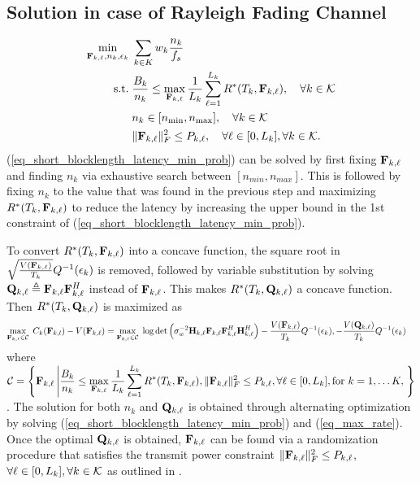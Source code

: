 \documentclass[a4paper, 12pt, onecolumn, journal, twoside, draftclsnofoot]{IEEEtran}
\begin{document}
\subsection{Solution in case of Rayleigh Fading Channel}
\begin{equation}
	\begin{split}
		\min_{{\bf F}_{k,\ell}, n_k, \epsilon_k} \;& \sum_{k \in K} w_k \frac{n_k}{f_s} \\
		\text{s.t.}\;& \frac{B_k}{n_k} \leq \max_{{\bf F}_{k, \ell}} \frac{1}{L_k} \sum_{\ell=1}^{L_k} 		R^*(T_{k}, {\bf F}_{k, \ell}), \quad \forall k \in { \mathcal{K} } \\ 
		& n_k \in [n_{\text{min}}, n_{\text{max}}], \quad \forall k \in { \mathcal{K} } \\
		& \|{\bf F}_{k,\ell}\|_F^2 \leq P_{k,\ell}, \quad \forall \ell \in [0, L_k],  \forall k \in { \mathcal{K} }.
	\end{split}
\label{eq_short_blocklength_latency_min_prob}
\end{equation}
(\ref{eq_short_blocklength_latency_min_prob}) can be solved by first fixing ${\bf F}_{k,\ell}$ and finding $n_k$ via exhaustive search between $[n_{min}, n_{max}]$.  This is followed by fixing $n_k$ to the value that was found in the previous step and maximizing $R^*(T_k, {\bf F}_{k,\ell})$ to reduce the latency by increasing the upper bound in the 1st constraint of (\ref{eq_short_blocklength_latency_min_prob}). 

To convert  $R^*(T_k, {\bf F}_{k,\ell})$ into a concave function, the square root in $\sqrt{\frac{V({\bf F}_{k,\ell})}{T_k}} Q^{-1}{(\epsilon_k)}$ is removed, followed by variable substitution by solving ${\bf Q}_{k,\ell} \triangleq {\bf F}_{k,\ell}{\bf F}_{k,\ell}^H$ instead of ${\bf F}_{k,\ell}$.  This makes $R^*(T_k, {\bf Q}_{k,\ell})$ a concave function. Then $R^*(T_k, {\bf Q}_{k,\ell})$ is maximized as 
\begin{equation}
	\begin{split}
		\max_{{\bf F}_{k,\ell} \in { \mathcal{C} }}  \; C_k({\bf F}_{k,l}) - V({\bf F}_{k,\ell}) 
&=  \max_{{\bf F}_{k,\ell} \in { \mathcal{C} }} \; \log \det \Big( \sigma_w^{-2} {\bf H}_{k,\ell} {\bf F}_{k,\ell} {\bf F}_{k,\ell}^H {\bf H}_{k,\ell}^H \Big)
   - \frac{V({\bf F}_{k,\ell})}{T_k} Q^{-1}(\epsilon_k),
   - \frac{V({\bf Q}_{k,\ell})}{T_k} Q^{-1}(\epsilon_k)
	\end{split}
\label{eq_max_rate}
\end{equation}
where $\displaystyle { \mathcal{C} } = \left\{ {\bf F}_{k,\ell} \left| \frac{B_k}{n_k} \leq \max_{{\bf F}_{k, \ell}} \frac{1}{L_k} \sum_{\ell=1}^{L_k} R^*(T_{k}, {\bf F}_{k, \ell}),   \|{\bf F}_{k,\ell}\|_F^2 \leq P_{k,\ell}, \forall \ell \in [0, L_k], \text{for } k = 1, \ldots K,   \right. \right\}$.  
The solution for both $n_k$ and ${\bf Q}_{k,\ell}$ is obtained through alternating optimization by solving (\ref{eq_short_blocklength_latency_min_prob}) and (\ref{eq_max_rate}).  Once the optimal ${\bf Q}_{k,\ell}$ is obtained, ${\bf F}_{k,\ell}$ can be found via a randomization procedure that satisfies the transmit power constraint $\|{\bf F}_{k,\ell}\|_F^2 \leq P_{k,\ell}$, $\forall \ell \in [0, L_k],  \forall k \in { \mathcal{K} }$ as outlined in \cite{chang2015semm}.
\end{document}
